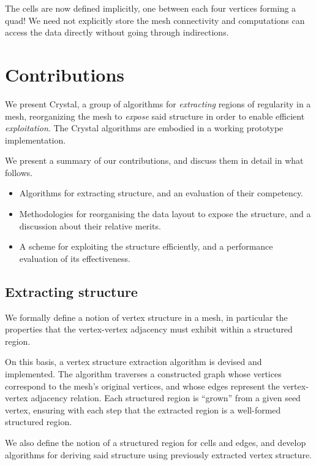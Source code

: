 The cells are now defined implicitly, one between each four vertices forming a quad! We need not explicitly store the mesh connectivity and computations can access the data directly without going through indirections.




\section{Contributions}

We present Crystal, a group of algorithms for \emph{extracting} regions of regularity in a mesh, reorganizing the mesh to \emph{expose} said structure in order to enable efficient \emph{exploitation}. The Crystal algorithms are embodied in a working prototype implementation.

We present a summary of our contributions, and discuss them in detail in what follows.

\begin{itemize}
\item Algorithms for extracting structure, and an evaluation of their competency.
\item Methodologies for reorganising the data layout to expose the structure, and a discussion about their relative merits.
\item A scheme for exploiting the structure efficiently, and a performance evaluation of its effectiveness.
\end{itemize}


\subsection{Extracting structure}
We formally define a notion of vertex structure in a mesh, in particular the properties that the vertex-vertex adjacency must exhibit within a structured region.


On this basis, a vertex structure extraction algorithm is devised and implemented. The algorithm traverses a constructed graph whose vertices correspond to the mesh's original vertices, and whose edges represent the vertex-vertex adjacency relation. Each structured region is ``grown'' from a given seed vertex, ensuring with each step that the extracted region is a well-formed structured region.

We also define the notion of a structured region for cells and edges, and develop algorithms for deriving said structure using previously extracted vertex structure.


